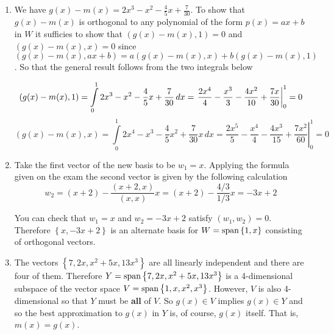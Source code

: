 \begin{enumerate}
\item We have $g(x) - m(x) = 2x^3 - x^2 - \frac{4}{5}x + \frac{7}{30}$.  To show that $g(x) - m(x)$ is orthogonal to any polynomial of the form $p(x) = ax + b$ in $W$ it sufficies to show that $(g(x)-m(x),1) = 0$ and $(g(x)-m(x),x) = 0$ since $(g(x) - m(x),ax+b) = a(g(x)-m(x),x) + b(g(x)-m(x),1)$. So that the general result follows from the two integrals below 

\[
\left( g(x) - m(x), 1 \right)  = \int\limits_{0}^{1} 2x^3 - x^2 - \frac{4}{5}x + \frac{7}{30} \, dx = \left. \frac{2x^4}{4} - \frac{x^3}{3} - \frac{4x^2}{10} + \frac{7x}{30} \right\vert_{0}^{1} = 0 \\
\]
\[
\left( g(x) - m(x), x \right)  = \int\limits_{0}^{1} 2x^4 - x^3 - \frac{4}{5}x^2 + \frac{7}{30}x \, dx = \left. \frac{2x^5}{5} - \frac{x^4}{4} - \frac{4x^3}{15} + \frac{7x^2}{60} \right\vert_{0}^{1} = 0 
\]

\item Take the first vector of the new basis to be $w_1 = x$.  Applying the formula given on the exam the second vector is given by the following calculation
\[
w_2 = (x+2) -  \frac{\left(x+2,x\right)}{\left(x,x\right)}x = (x+2) - \frac{4/3}{1/3}x = -3x + 2 
\]

You can check that $w_1 = x$ and $w_2 = -3x + 2$ satisfy $(w_1,w_2) = 0$.  Therefore $\left\{ x, -3x+2 \right\}$ is an alternate basis for $W = {\rm span}\left\{1,x\right\}$ consisting of orthogonal vectors.

\item The vectors $\left\{ 7, 2x, x^2 + 5x, 13x^3 \right\}$ are all linearly independent and there are four of them.  Therefore $Y = {\rm span}\left\{ 7, 2x, x^2 + 5x, 13x^3 \right\}$ is a 4-dimensional subspace of  the vector space $V = {\rm span}\left\{ 1, x, x^2, x^3 \right\}$.  However, $V$ is also 4-dimensional so that $Y$ must be \textbf{all} of $V$.  So $g(x) \in V$ implies $g(x) \in Y$ and so the best approximation to $g(x)$ in $Y$ is, of course, $g(x)$ itself.  That is, $m(x) = g(x)$. 

\end{enumerate}